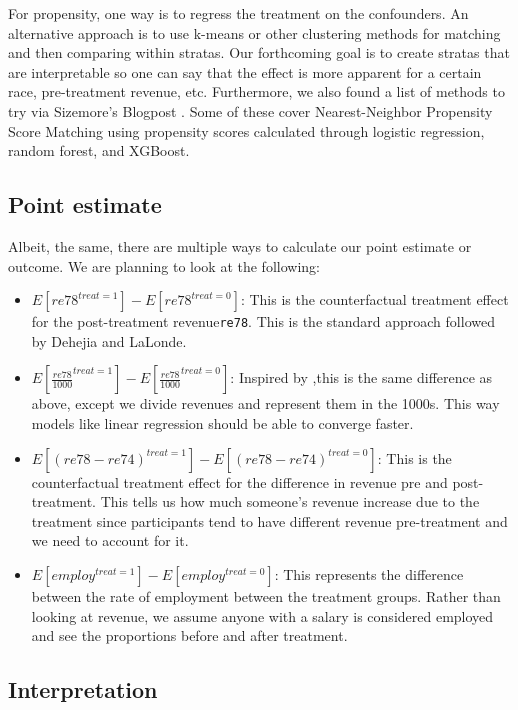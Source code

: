 \documentclass[12pt]{article}
\begin{document}
For propensity, one way is to regress the treatment on the confounders. An alternative approach is to use k-means or other clustering methods for matching and then comparing within stratas. Our forthcoming goal is to create stratas that are interpretable so one can say that the effect is more apparent for a certain race, pre-treatment revenue, etc. Furthermore, we also found a list of methods to try via Sizemore's Blogpost \cite{humboldt_matching}. Some of these cover Nearest-Neighbor Propensity Score Matching using propensity scores calculated through logistic regression, random forest, and XGBoost.

\subsection{Point estimate}

Albeit, the same, there are multiple ways to calculate our point estimate or outcome. We are planning to look at the following:
\begin{itemize}[itemsep=-0.25em]
\item{$E[re78^{treat=1}] - E[re78^{treat=0}]$: This is the counterfactual treatment effect for the post-treatment revenue{\tt re78}. This is the standard approach followed by Dehejia and LaLonde.}
\item{$E[\frac{re78}{1000}^{treat=1}] - E[\frac{re78}{1000}^{treat=0}]$: Inspired by \cite{english2016causal},this is the same difference as above, except we divide revenues and represent them in the 1000s. This way models like linear regression should be able to converge faster.}
\item{$E[(re78 - re74)^{treat=1}] - E[(re78 - re74)^{treat=0}]$: This is the counterfactual treatment effect for the difference in revenue pre and post-treatment. This tells us how much someone's revenue increase due to the treatment since participants tend to have different revenue pre-treatment and we need to account for it.}
\item{$E[employ^{treat=1}] - E[employ^{treat=0}]$: This represents the difference between the rate of employment between the treatment groups. Rather than looking at revenue, we assume anyone with a salary is considered employed and see the proportions before and after treatment.}
\end{itemize}

\subsection{Interpretation}
\end{document}
